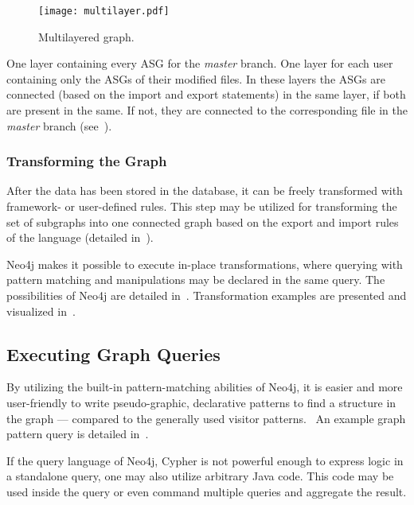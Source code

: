 \begin{figure}[!htb]
  \centering
  \texttt{[image: multilayer.pdf]}
  \caption{Multilayered graph.}
  \label{fig:multilayered-graph}
\end{figure}

One layer containing every ASG for the \emph{master} branch. One layer for each user containing only the ASGs of their modified files. In these layers the ASGs are connected (based on the import and export statements) in the same layer, if both are present in the same. If not, they are connected to the corresponding file in the \emph{master} branch (see~).

\subsubsection{Transforming the Graph}
After the data has been stored in the database, it can be freely transformed with framework- or user-defined rules. This step may be utilized for transforming the set of subgraphs into one connected graph based on the export and import rules of the language (detailed in~).

Neo4j makes it possible to execute in-place transformations, where querying with pattern matching and manipulations may be declared in the same query. The possibilities of Neo4j are detailed in~. Transformation examples are presented and visualized in~.

\subsection{Executing Graph Queries}
By utilizing the built-in pattern-matching abilities of Neo4j, it is easier and more user-friendly to write pseudo-graphic, declarative patterns to find a structure in the graph --- compared to the generally used visitor patterns.~\cite{csmr} An example graph pattern query is detailed in~.

If the query language of Neo4j, Cypher is not powerful enough to express logic in a standalone query, one may also utilize arbitrary Java code. This code may be used inside the query or even command multiple queries and aggregate the result.
